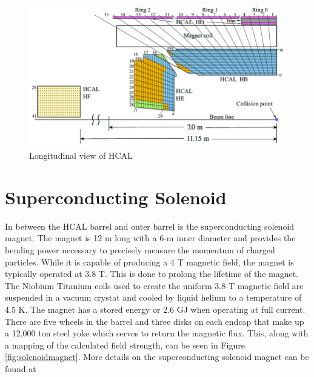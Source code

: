 \begin{figure}[h]
	\centering
	\includegraphics[width=1.0\linewidth]{Figures/hcal_longitudinal}
	\caption{Longitudinal view of HCAL \cite{CERN-LHCC-97-031}}
	\label{fig:hcallongitudinal}
\end{figure}

\section{Superconducting Solenoid}
In between the HCAL barrel and outer barrel is the superconducting solenoid magnet.  The magnet is 12 m long with a 6-m inner diameter and provides the bending power necessary to precisely measure the momentum of charged particles.  While it is capable of producing a 4 T magnetic field, the magnet is typically operated at 3.8 T.  This is done to prolong the lifetime of the magnet.  The Niobium Titanium coils used to create the uniform 3.8-T magnetic field are suspended in a vacuum crystat and cooled by liquid helium to a temperature of 4.5 K.  The magnet has a stored energy or 2.6 GJ when operating at full current.  There are five wheels in the barrel and three disks on each endcap that make up a 12,000 ton steel yoke which serves to return the magnetic flux.  This, along with a mapping of the calculated field strength, can be seen in Figure \ref{fig:solenoidmagnet}.  More details on the superconducting solenoid magnet can be found at \cite{CERN-LHCC-97-033}

